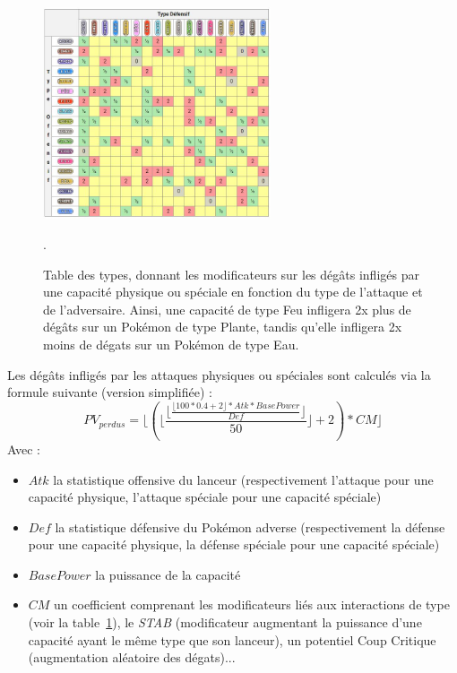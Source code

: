 \documentclass[a4paper,12pt]{article}
\begin{document}
\begin{figure}[!h]
    \centering
    \includegraphics[width=0.6\textwidth]{Image/table-des-types-pour-pokemon-arceus.jpg}
    \caption{Table des types, donnant les modificateurs sur les dégâts infligés
    par une capacité physique ou spéciale en fonction du type de l'attaque et de
    l'adversaire. Ainsi, une capacité de type Feu infligera 2x plus de dégâts
    sur un Pokémon de type Plante, tandis qu'elle infligera 2x moins de dégats
    sur un Pokémon de type Eau.}.
    \label{fig:tabletype}
\end{figure}

Les dégâts infligés par les attaques physiques ou spéciales sont calculés via la
formule suivante (version simplifiée) :
\begin{equation}
    PV_{perdus}=\lfloor ( \lfloor \frac{\lfloor \frac{\lfloor 100*0.4+2 \rfloor * Atk * BasePower}{Def}\rfloor}{50}\rfloor +2)*CM \rfloor
\end{equation}
Avec :
\begin{itemize}
    \item $Atk$ la statistique offensive du lanceur (respectivement l'attaque
    pour une capacité physique, l'attaque spéciale pour une capacité spéciale)
    \item $Def$ la statistique défensive du Pokémon adverse (respectivement la
    défense pour une capacité physique, la défense spéciale pour une capacité
    spéciale)
    \item $BasePower$ la puissance de la capacité
    \item $CM$ un coefficient comprenant les modificateurs liés aux interactions
    de type (voir la table~\ref{fig:tabletype}), le \textit{STAB} (modificateur
    augmentant la puissance d'une capacité ayant le même type que son lanceur),
    un potentiel Coup Critique (augmentation aléatoire des dégats)...
\end{itemize}
\end{document}
